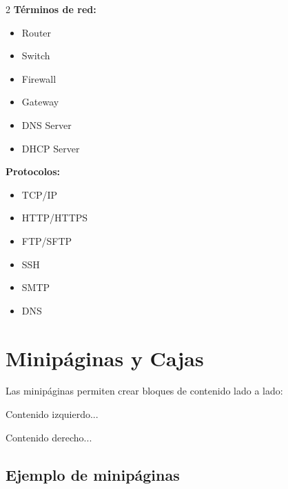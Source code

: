\begin{multicols}{2}
\small
\textbf{Términos de red:}
\begin{itemize}
  \item Router
  \item Switch
  \item Firewall
  \item Gateway
  \item DNS Server
  \item DHCP Server
\end{itemize}

\columnbreak

\textbf{Protocolos:}
\begin{itemize}
  \item TCP/IP
  \item HTTP/HTTPS
  \item FTP/SFTP
  \item SSH
  \item SMTP
  \item DNS
\end{itemize}
\end{multicols}

\section{Minipáginas y Cajas}
\label{sec:minipaginas}

Las minipáginas permiten crear bloques de contenido lado a lado:

\begin{latexcode}[title={Dos minipáginas lado a lado}]
\begin{minipage}[t]{0.45\textwidth}
  Contenido izquierdo...
\end{minipage}
\hfill
\begin{minipage}[t]{0.45\textwidth}
  Contenido derecho...
\end{minipage}
\end{latexcode}

\subsection{Ejemplo de minipáginas}
\label{subsec:ejemplo-minipaginas}

